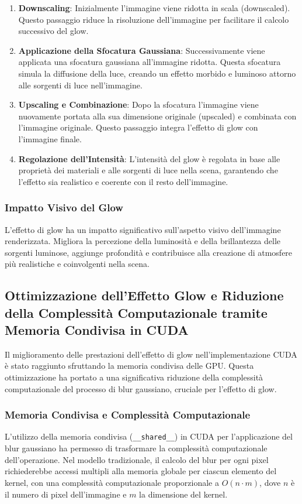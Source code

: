 \documentclass[12pt]{article}
\begin{document}
\begin{enumerate}
\item \textbf{Downscaling}: Inizialmente l'immagine viene ridotta in scala (downscaled). Questo passaggio riduce la risoluzione dell'immagine per facilitare il calcolo successivo del glow.

\item \textbf{Applicazione della Sfocatura Gaussiana}: Successivamente viene applicata una sfocatura gaussiana all'immagine ridotta. Questa sfocatura simula la diffusione della luce, creando un effetto morbido e luminoso attorno alle sorgenti di luce nell'immagine.

\item \textbf{Upscaling e Combinazione}: Dopo la sfocatura l'immagine viene nuovamente portata alla sua dimensione originale (upscaled) e combinata con l'immagine originale. Questo passaggio integra l'effetto di glow con l'immagine finale.

\item \textbf{Regolazione dell'Intensità}: L'intensità del glow è regolata in base alle proprietà dei materiali e alle sorgenti di luce nella scena, garantendo che l'effetto sia realistico e coerente con il resto dell'immagine.
\end{enumerate}

\subsubsection{Impatto Visivo del Glow}
L'effetto di glow ha un impatto significativo sull'aspetto visivo dell'immagine renderizzata. Migliora la percezione della luminosità e della brillantezza delle sorgenti luminose, aggiunge profondità e contribuisce alla creazione di atmosfere più realistiche e coinvolgenti nella scena.

\subsection{Ottimizzazione dell'Effetto Glow e Riduzione della Complessità Computazionale tramite Memoria Condivisa in CUDA}
Il miglioramento delle prestazioni dell'effetto di glow nell'implementazione CUDA è stato raggiunto sfruttando la memoria condivisa delle GPU. Questa ottimizzazione ha portato a una significativa riduzione della complessità computazionale del processo di blur gaussiano, cruciale per l'effetto di glow.

\subsubsection{Memoria Condivisa e Complessità Computazionale}
L'utilizzo della memoria condivisa (\texttt{\_\_shared\_\_}) in CUDA per l'applicazione del blur gaussiano ha permesso di trasformare la complessità computazionale dell'operazione. Nel modello tradizionale, il calcolo del blur per ogni pixel richiederebbe accessi multipli alla memoria globale per ciascun elemento del kernel, con una complessità computazionale proporzionale a \(O(n \cdot m)\), dove \(n\) è il numero di pixel dell'immagine e \(m\) la dimensione del kernel.
\end{document}

